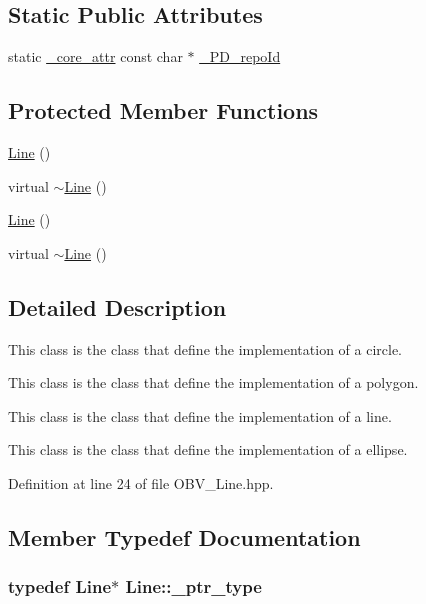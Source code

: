 \subsection*{Static Public Attributes}
\begin{DoxyCompactItemize}
\item 
static \hyperlink{_petit_prince_8hpp_a5f7bf7cddb608c2aad7c95f55f8a33c5}{\+\_\+core\+\_\+attr} const char $\ast$ \hyperlink{class_line_a38707cdd2f006195ad299c521928dc32}{\+\_\+\+P\+D\+\_\+repo\+Id}
\end{DoxyCompactItemize}
\subsection*{Protected Member Functions}
\begin{DoxyCompactItemize}
\item 
\hyperlink{class_line_acc11b8a429d8cdd63ba6803dff5602b3}{Line} ()
\item 
virtual \hyperlink{class_line_a4a95bafcefa28672b3999deb011b9e50}{$\sim$\+Line} ()
\item 
\hyperlink{class_line_acc11b8a429d8cdd63ba6803dff5602b3}{Line} ()
\item 
virtual \hyperlink{class_line_a4a95bafcefa28672b3999deb011b9e50}{$\sim$\+Line} ()
\end{DoxyCompactItemize}


\subsection{Detailed Description}
This class is the class that define the implementation of a circle. 

This class is the class that define the implementation of a polygon.

This class is the class that define the implementation of a line.

This class is the class that define the implementation of a ellipse. 

Definition at line 24 of file O\+B\+V\+\_\+\+Line.\+hpp.



\subsection{Member Typedef Documentation}
\subsubsection[{\texorpdfstring{\+\_\+ptr\+\_\+type}{_ptr_type}}]{\setlength{\rightskip}{0pt plus 5cm}typedef {\bf Line}$\ast$ {\bf Line\+::\+\_\+ptr\+\_\+type}}\hypertarget{class_line_a886875fa295d09a973b952a38d791975}{}\label{class_line_a886875fa295d09a973b952a38d791975}


